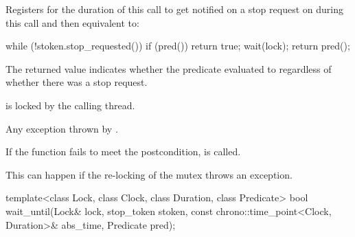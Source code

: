 \begin{itemdescr}
\pnum
\effects
Registers for the duration of this call 
to get notified on a stop request on 
during this call and then equivalent to:
\begin{codeblock}
while (!stoken.stop_requested()) {
  if (pred())
    return true;
  wait(lock);
}
return pred();
\end{codeblock}

\pnum
\begin{note}
The returned value indicates whether the predicate evaluated to
 regardless of whether there was a stop request.
\end{note}

\pnum
\ensures
{} is locked by the calling thread.

\pnum
\throws
Any exception thrown by .

\pnum
\remarks
If the function fails to meet the postcondition,
 is called.
\begin{note}
This can happen if the re-locking of the mutex throws an exception.
\end{note}
\end{itemdescr}

\begin{itemdecl}
template<class Lock, class Clock, class Duration, class Predicate>
  bool wait_until(Lock& lock, stop_token stoken,
                  const chrono::time_point<Clock, Duration>& abs_time, Predicate pred);
\end{itemdecl}

